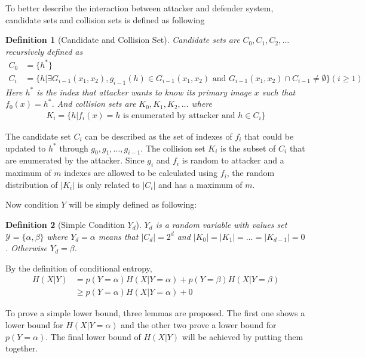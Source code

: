 \documentclass[10pt,a4paper]{article}
\newtheorem{mydef}{Definition}
\begin{document}
		To better describe the interaction between attacker and defender
		system, candidate sets and collision sets is defined as following
		\begin{mydef}[Candidate and Collision Set]
			Candidate sets are $C_0, C_1, C_2, \ldots$ recursively defined as
			\begin{align*}
				C_0 &= \{h^*\}\\
				C_i &= \{h | \exists G_{i-1}(x_1, x_2),
					g_{i-1}(h) \in G_{i-1}(x_1, x_2) \text{ and } 
					G_{i-1}(x_1, x_2) \cap C_{i-1} \neq \emptyset \} (i \geq 1)
			\end{align*}
			Here $h^*$ is the index that attacker wants to know its primary image
			$x$ such that $f_0(x) = h^*$. And collision sets are $K_0, K_1, K_2, \ldots$ where
			\begin{align*}
				K_i = \{h | f_i(x) = h \text{ is enumerated by attacker and } h \in C_i \}
			\end{align*}
		\end{mydef}
		
		The candidate set $C_i$ can be described as the set of indexes of $f_i$ that could be
		updated to $h^*$ through $g_0, g_1, \ldots, g_{i-1}$. The collision set $K_i$ is the
		subset of $C_i$ that are enumerated by the attacker. Since $g_i$ and $f_i$ is random
		to attacker and a maximum of $m$ indexes are allowed to be calculated using $f_i$, 
		the random distribution of $|K_i|$ is only related to $|C_i|$ and has a maximum
		of $m$. 
		
		Now condition $Y$ will be simply defined as following:
		\begin{mydef}[Simple Condition $Y_d$]
			$Y_d$ is a random variable with values set
			$\mathcal Y = \{ \alpha, \beta \}$ where
			$Y_d = \alpha$ means that $|C_d| = 2^d$
			and $|K_0| = |K_1| = \ldots = |K_{d-1}| = 0$.
			Otherwise $Y_d = \beta$.
		\end{mydef}
		
		By the definition of conditional entropy,
		\begin{align*}
			H(X|Y) &= p(Y = \alpha) H(X | Y = \alpha) + p(Y = \beta) H(X | Y = \beta)\\
				&\geq p(Y = \alpha) H(X | Y = \alpha) + 0
		\end{align*}
		
		To prove a simple lower bound, three lemmas are proposed.
		The first one shows a lower bound for $H(X | Y = \alpha)$
		and the other two prove a lower bound for $p(Y = \alpha)$.
		The final lower bound of $H(X | Y)$ will be achieved by putting
		them together.
		
\end{document}
